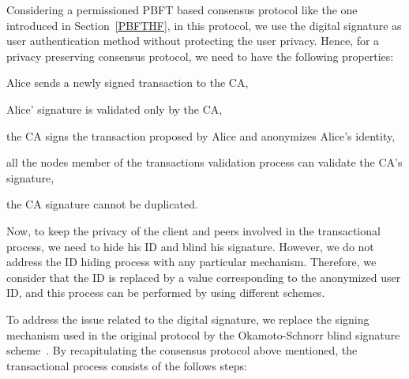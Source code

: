 \documentclass[conference]{llncs}
\begin{document}
Considering a permissioned PBFT based consensus protocol like the one introduced in Section~\ref{PBFTHF}, in this protocol, we use the digital signature as user authentication method without protecting the user privacy. Hence, for a privacy preserving consensus protocol, we need to have the following properties:

\begin{compactitem}
    \item Alice sends a newly signed transaction to the CA,
    \item Alice’ signature is validated only by the CA,
    \item the CA signs the transaction proposed by Alice and anonymizes Alice’s identity,
    \item all the nodes member of the transactions validation process can validate the CA's signature,
    \item the CA signature cannot be duplicated.
\end{compactitem}

Now, to keep the privacy of the client and peers involved in the transactional process, we need to hide his ID and blind his signature. However, we do not address the ID hiding process with any particular mechanism. Therefore, we consider that the ID is replaced by a value corresponding to the anonymized user ID, and this process can be performed by using different schemes.

To address the issue related to the digital signature, we  replace the signing mechanism used in the original protocol by the Okamoto-Schnorr blind signature scheme~\cite{okamoto1992provably}. By recapitulating the consensus protocol above mentioned, the transactional process consists of the follows steps:
\end{document}
